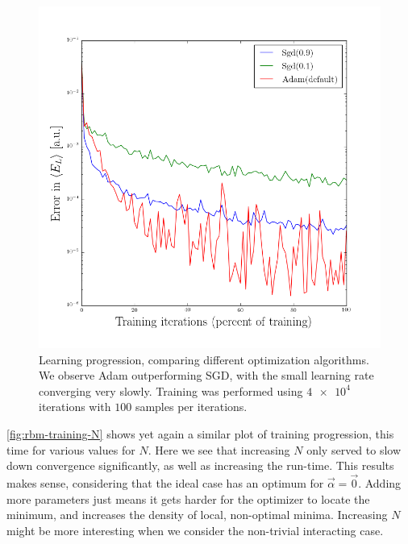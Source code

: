 \documentclass[a4paper, 11pt]{article}
\begin{document}
\begin{figure}[ht]
    \centering
    \includegraphics[width=0.8\linewidth]{../results/learning-optimizers.png}
    \caption{Learning progression, comparing different optimization algorithms.
    We observe Adam outperforming SGD, with the small learning rate converging
    very slowly. Training was performed using $\num{4e4}$ iterations with $100$
    samples per iterations.}
    \label{fig:rbm-training-optimizers}
\end{figure}


\begin{multicols}{2}

    \autoref{fig:rbm-training-N} shows yet again a similar plot of training
    progression, this time for various values for $N$. Here we see that
    increasing $N$ only served to slow down convergence significantly, as well
    as increasing the run-time. This results makes sense, considering that the
    ideal case has an optimum for $\vec \alpha=\vec 0$. Adding more parameters
    just means it gets harder for the optimizer to locate the minimum, and
    increases the density of local, non-optimal minima. Increasing $N$ might be
    more interesting when we consider the non-trivial interacting case.

    \printbibliography

\end{multicols}
\end{document}
